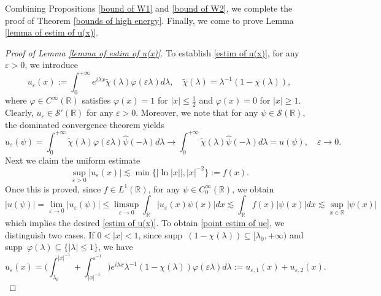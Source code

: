 \documentclass[reqno]{amsart}
\newcommand\R{\mathbb{R}}
\newcommand\mcaS{\mathcal{S}}
\numberwithin{equation}{section}
\begin{document}
Combining Propositions \ref{bound of W1} and \ref{bound of W2}, we complete the proof of Theorem \ref{bounds of high energy}. Finally, we come to prove Lemma \ref{lemma of estim of u(x)}.
\begin{proof}[Proof of Lemma {\rm\ref{lemma of estim of u(x)}}]

To establish \eqref{estim of u(x)}, for any $\varepsilon>0$, we introduce
\begin{equation*}
    u_{\varepsilon}(x):=\int_{0}^{+\infty}e^{i\lambda x}\widetilde{\chi}(\lambda)\varphi(\varepsilon \lambda) d\lambda,\quad \widetilde{\chi}(\lambda)=\lambda^{-1}(1-\chi(\lambda)),
\end{equation*}
where $\varphi\in C^{\infty}(\R)$ satisfies $\varphi(x)=1$ for $|x|\leq\frac{1}{2}$ and $\varphi(x)=0$ for $|x|\geq1$.
Clearly, $u_{\varepsilon}\in \mcaS'(\R)$ for any $\varepsilon>0$. Moreover, we note that for any $\psi\in\mcaS(\R)$, the dominated convergence theorem yields
\begin{equation*}
    u_{\varepsilon}(\psi)=\int_{0}^{+\infty}\widetilde{\chi}(\lambda)\varphi(\varepsilon \lambda)\hat{\psi}(-\lambda)d\lambda\rightarrow\int_{0}^{+\infty}\widetilde{\chi}(\lambda)\hat{\psi}(-\lambda)d\lambda=u(\psi),\quad \varepsilon\rightarrow0.
\end{equation*}
Next we claim the uniform estimate
\begin{equation}\label{point estim of ue}
\sup\limits_{\varepsilon>0}|u_{\varepsilon}(x)|\lesssim \min\{|\ln|x||,|x|^{-2}\}:=f(x).
\end{equation}
Once this is proved, since $f\in L^1(\R)$, for any $\psi\in C^{\infty}_0(\R)$, we obtain
\begin{equation*}
|u(\psi)|=\lim\limits_{\varepsilon\rightarrow0}|u_{\varepsilon}(\psi)|\leq\limsup\limits_{\varepsilon\rightarrow0}\int_{\R}|u_{\varepsilon}(x)\psi(x)|dx\lesssim\int_{\R}f(x)|\psi(x)|dx\lesssim \sup\limits_{x\in\R}|\psi(x)|
\end{equation*}
which implies the desired \eqref{estim of u(x)}.
To obtain \eqref{point estim of ue}, we distinguish two cases. If $0<|x|<1$, since supp~$(1-\chi(\lambda))\subseteq[\lambda_0,+\infty)$ and supp~$\varphi(\lambda)\subseteq\{|\lambda|\leq1\}$, we have 
\begin{equation*}
u_{\varepsilon}(x)=\Big(\int_{\lambda_0}^{|x|^{-1}}+\int_{|x|^{-1}}^{\varepsilon^{-1}}\Big)e^{i\lambda x}\lambda^{-1}(1-\chi(\lambda))\varphi(\varepsilon \lambda) d\lambda:=u_{\varepsilon,1}(x)+u_{\varepsilon,2}(x).
\end{equation*}

\end{proof}
\end{document}
